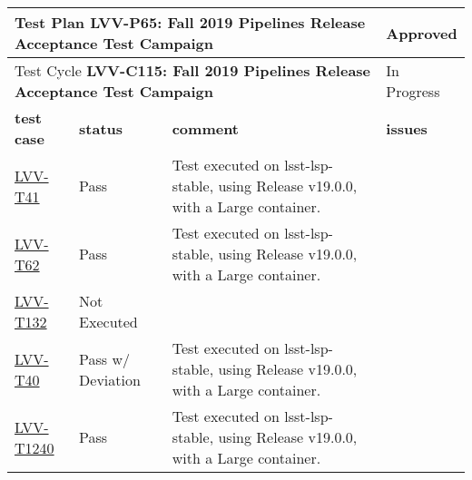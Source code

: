 \documentclass[DM,lsstdraft,STR,toc]{lsstdoc}
\begin{document}
\begin{longtable}{p{2cm}p{2.5cm}p{9cm}p{2.5cm}}
\toprule
\multicolumn{3}{l}{ Test Plan {\bf LVV-P65:  Fall 2019 Pipelines Release Acceptance Test Campaign
 }} & Approved \\\hline

  \multicolumn{3}{l}{ Test Cycle {\bf LVV-C115:  Fall 2019 Pipelines Release Acceptance Test Campaign
 }} & In Progress \\\hline

  {\bf \footnotesize test case} & {\bf \footnotesize status} & {\bf \footnotesize comment} & {\bf \footnotesize issues} \\\toprule

\href{https://jira.lsstcorp.org/secure/Tests.jspa#/testCase/LVV-T41}{LVV-T41}
    & Pass &
    \begin{minipage}[]{9cm}
    \smallskip
     Test executed on lsst-lsp-stable, using Release v19.0.0, with a Large
container.

    \medskip
    \end{minipage}
    &
    \\\hline
\href{https://jira.lsstcorp.org/secure/Tests.jspa#/testCase/LVV-T62}{LVV-T62}
    & Pass &
    \begin{minipage}[]{9cm}
    \smallskip
     Test executed on lsst-lsp-stable, using Release v19.0.0, with a Large
container.

    \medskip
    \end{minipage}
    &
    \\\hline
\href{https://jira.lsstcorp.org/secure/Tests.jspa#/testCase/LVV-T132}{LVV-T132}
    & Not Executed &
    \begin{minipage}[]{9cm}
    \smallskip
    
    \medskip
    \end{minipage}
    &
    \\\hline
\href{https://jira.lsstcorp.org/secure/Tests.jspa#/testCase/LVV-T40}{LVV-T40}
    & Pass w/ Deviation &
    \begin{minipage}[]{9cm}
    \smallskip
     Test executed on lsst-lsp-stable, using Release v19.0.0, with a Large
container.

    \medskip
    \end{minipage}
    &
    \\\hline
\href{https://jira.lsstcorp.org/secure/Tests.jspa#/testCase/LVV-T1240}{LVV-T1240}
    & Pass &
    \begin{minipage}[]{9cm}
    \smallskip
     Test executed on lsst-lsp-stable, using Release v19.0.0, with a Large
container.


\end{minipage}
\end{longtable}
\end{document}
